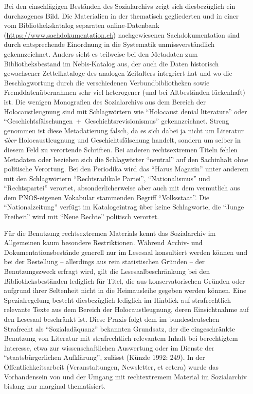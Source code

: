 \documentclass[a4paper,
fontsize=11pt,
oneside,
numbers=noperiodatend,
parskip=half-,
bibliography=totoc,
final
]{scrartcl}
\begin{document}
Bei den einschlägigen Beständen des Sozialarchivs zeigt sich
diesbezüglich ein durchzogenes Bild. Die Materialien in der thematisch
gegliederten und in einer vom Bibliothekskatalog separaten
online-Datenbank (\url{https://www.sachdokumentation.ch}) nachgewiesenen
Sachdokumentation sind durch entsprechende Einordnung in die Systematik
unmissverständlich gekennzeichnet. Anders sieht es teilweise bei den
Metadaten zum Bibliotheksbestand im Nebis-Katalog aus, der auch die
Daten historisch gewachsener Zettelkataloge des analogen Zeitalters
integriert hat und wo die Beschlagwortung durch die verschiedenen
Verbundbibliotheken sowie Fremddatenübernahmen sehr viel heterogener
(und bei Altbeständen lückenhaft) ist. Die wenigen Monografien des
Sozialarchivs aus dem Bereich der Holocaustleugnung sind mit
Schlagwörtern wie \enquote{Holocaust denial literature} oder
\enquote{Geschichtsfälschungen~+~Geschichtsrevisionismus}
gekennzeichnet. Streng genommen ist diese Metadatierung falsch, da es
sich dabei ja nicht um Literatur \emph{über} Holocaustleugnung und
Geschichtsfälschung handelt, sondern um selber in diesem Feld zu
verortende Schriften. Bei anderen rechtsextremen Titeln fehlen Metadaten
oder beziehen sich die Schlagwörter \enquote{neutral} auf den Sachinhalt
ohne politische Verortung. Bei den Periodika wird das \enquote{Harus
Magazin} unter anderem mit den Schlagwörtern \enquote{Rechtsradikale
Partei}, \enquote{Nationalismus} und \enquote{Rechtspartei} verortet,
absonderlicherweise aber auch mit dem vermutlich aus dem PNOS-eigenen
Vokabular stammenden Begriff \enquote{Volksstaat}. Die
\enquote{Nationalzeitung} verfügt im Katalogeintrag über keine
Schlagworte, die \enquote{Junge Freiheit} wird mit \enquote{Neue Rechte}
politisch verortet.

Für die Benutzung rechtsextremen Materials kennt das Sozialarchiv im
Allgemeinen kaum besondere Restriktionen. Während Archiv- und
Dokumentationsbestände generell nur im Lesesaal konsultiert werden
können und bei der Bestellung -- allerdings aus rein statistischen
Gründen -- der Benutzungszweck erfragt wird, gilt die
Lesesaalbeschränkung bei den Bibliotheksbeständen lediglich für Titel,
die aus konservatorischen Gründen oder aufgrund ihrer Seltenheit nicht
in die Heimausleihe gegeben werden können. Eine Spezialregelung besteht
diesbezüglich lediglich im Hinblick auf strafrechtlich relevante Texte
aus dem Bereich der Holocaustleugnung, deren Einsichtnahme auf den
Lesesaal beschränkt ist. Diese Praxis folgt dem im bundesdeutschen
Strafrecht als \enquote{Sozialadäquanz} bekannten Grundsatz, der die
eingeschränkte Benutzung von Literatur mit strafrechtlich relevantem
Inhalt bei berechtigtem Interesse, etwa zur wissenschaftlichen
Auswertung oder im Dienste der \enquote{staatsbürgerlichen Aufklärung},
zulässt (Künzle 1992: 249). In der Öffentlichkeitsarbeit
(Veranstaltungen, Newsletter, et cetera) wurde das Vorhandensein von und
der Umgang mit rechtextremem Material im Sozialarchiv bislang nur
marginal thematisiert.
\end{document}
